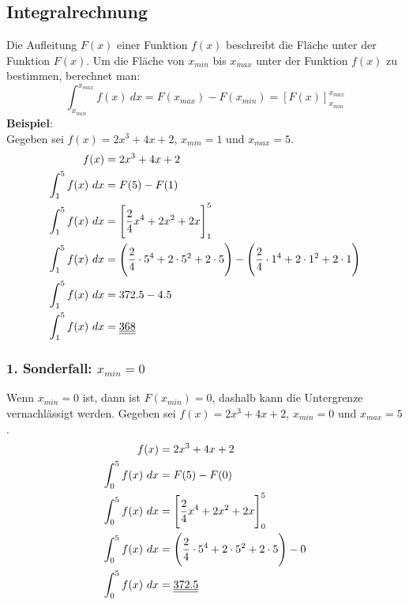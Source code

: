 \documentclass[a4paper,12pt]{article}
\begin{document}
\subsection{Integralrechnung}
Die Aufleitung $F(x)$ einer Funktion $f(x)$ beschreibt die Fläche unter der Funktion $F(x)$.
Um die Fläche von $x_{min}$ bis $x_{max}$ unter der Funktion $f(x)$ zu bestimmen, berechnet man:
$$\int_{x_{min}}^{x_{max}} f(x)\ dx = F(x_{max}) - F(x_{min}) = [F(x)]_{x_{min}}^{x_{max}}$$
\textbf{Beispiel}:\\
Gegeben sei $f(x) = 2x^3 + 4x + 2$, $x_{min} = 1$ und $x_{max} = 5$.
\begin{equation*}
\begin{split}
f(x) & = 2x^3 + 4x + 2\\
\int_1^5 f(x)\ dx & = F(5) - F(1)\\
\int_1^5 f(x)\ dx & = \Bigg{[}\frac{2}{4}x^4 + 2x^2 + 2x\Bigg{]}_1^5\\
\int_1^5 f(x)\ dx & = \Bigg{(}\frac{2}{4} \cdot 5^4 + 2\cdot 5^2 + 2 \cdot 5\Bigg{)} - \Bigg{(}\frac{2}{4} \cdot 1^4 + 2\cdot 1^2 + 2 \cdot 1\Bigg{)}\\
\int_1^5 f(x)\ dx & = 372.5 - 4.5\\
\int_1^5 f(x)\ dx & = \underline{\underline{368}}
\end{split}
\end{equation*}
\subsubsection{1. Sonderfall: $x_{min} = 0$}
Wenn $x_{min} = 0$ ist, dann ist $F(x_{min}) = 0$, dashalb kann die Untergrenze vernachlässigt werden.
Gegeben sei $f(x) = 2x^3 + 4x + 2$, $x_{min} = 0$ und $x_{max} = 5$.
\begin{equation*}
\begin{split}
f(x) & = 2x^3 + 4x + 2\\
\int_0^5 f(x)\ dx & = F(5) - F(0)\\
\int_0^5 f(x)\ dx & = \Bigg{[}\frac{2}{4}x^4 + 2x^2 + 2x\Bigg{]}_0^5\\
\int_0^5 f(x)\ dx & = \Bigg{(}\frac{2}{4} \cdot 5^4 + 2\cdot 5^2 + 2 \cdot 5\Bigg{)} - 0\\
\int_0^5 f(x)\ dx & = \underline{\underline{372.5}}
\end{split}
\end{equation*}
\end{document}
